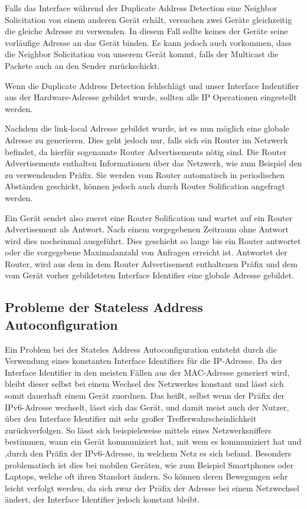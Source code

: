 \documentclass[a4paper, 12pt]{scrartcl}
\begin{document}
Falls das Interface während der Duplicate Address Detection eine Neighbor Solicitation von einem anderen Gerät erhält, versuchen zwei Geräte gleichzeitig die gleiche Adresse zu verwenden. In diesem Fall sollte keines der Geräte seine vorläufige Adresse an das Gerät binden. Es kann jedoch auch vorkommen, dass die Neighbor Solicitation von unserem Gerät kommt, falls der Multicast die Packete auch an den Sender zurückschickt.

Wenn die Duplicate Address Detection fehlschlägt und unser Interface Indentifier aus der Hardware-Adresse gebildet wurde, sollten alle IP Operationen eingestellt werden.

Nachdem die link-local Adresse gebildet wurde, ist es nun möglich eine globale Adresse zu generieren. Dies geht jedoch nur, falls sich ein Router im Netzwerk befindet, da hierfür sogenannte Router Advertisements nötig sind. Die Router Advertisements enthalten Informationen über das Netzwerk, wie zum Beispiel den zu verwendenden Präfix.
Sie werden vom Router automatisch in periodischen Abständen geschickt, können jedoch auch durch Router Solification angefragt werden.

Ein Gerät sendet also zuerst eine Router Solification und wartet auf ein Router Advertisement als Antwort. Nach einem vorgegebenen Zeitraum ohne Antwort wird dies nocheinmal ausgeführt. Dies geschieht so lange bis ein Router antwortet oder die vorgegebene Maximalanzahl von Anfragen erreicht ist. 
Antwortet der Router, wird aus dem in dem Router Advertisement enthaltenen Präfix und dem vom Gerät vorher gebildeteten Interface Identifier eine globale Adresse gebildet.



\newpage
\subsection{Probleme der Stateless Address Autoconfiguration}
Ein Problem bei der Stateles Address Autoconfiguration entsteht durch die Verwendung eines konstanten Interface Identifiers für die IP-Adresse. 
Da der Interface Identifier in den meisten Fällen aus der MAC-Adresse generiert wird, bleibt dieser selbst bei einem Wechsel des Netzwerkes konstant und lässt sich somit dauerhaft einem Gerät zuordnen.
Das heißt, selbst wenn der Präfix der IPv6-Adresse wechselt, lässt sich das Gerät, und damit meist auch der Nutzer, über den Interface Identifier mit sehr großer Trefferwahrscheinlichkeit zurückverfolgen.
So lässt sich beispielsweise mittels eines Netzwerksniffers bestimmen, wann ein Gerät kommuniziert hat, mit wem es kommuniziert hat und ,durch den Präfix der IPv6-Adresse, in welchem Netz es sich befand.
Besonders problematisch ist dies bei mobilen Geräten, wie zum Beispiel Smartphones oder Laptops, welche oft ihren Standort ändern.
So können deren Bewegungen sehr leicht verfolgt werden, da sich zwar der Präfix der Adresse bei einem Netzwechsel ändert, der Interface Identifier jedoch konstant bleibt. 
\end{document}
